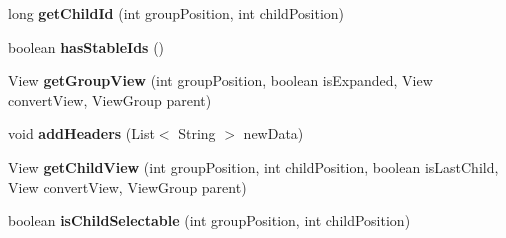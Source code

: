 \begin{DoxyCompactItemize}
\item 
long {\bfseries get\+Child\+Id} (int group\+Position, int child\+Position)\hypertarget{classcom_1_1example_1_1sebastian_1_1tindertp_1_1ExpandableAdpProfile_a355d89c86b95f70f943f68bb691730bb}{}\label{classcom_1_1example_1_1sebastian_1_1tindertp_1_1ExpandableAdpProfile_a355d89c86b95f70f943f68bb691730bb}

\item 
boolean {\bfseries has\+Stable\+Ids} ()\hypertarget{classcom_1_1example_1_1sebastian_1_1tindertp_1_1ExpandableAdpProfile_a005cee212d34b274759437fced99ae5c}{}\label{classcom_1_1example_1_1sebastian_1_1tindertp_1_1ExpandableAdpProfile_a005cee212d34b274759437fced99ae5c}

\item 
View {\bfseries get\+Group\+View} (int group\+Position, boolean is\+Expanded, View convert\+View, View\+Group parent)\hypertarget{classcom_1_1example_1_1sebastian_1_1tindertp_1_1ExpandableAdpProfile_ab4424117d8d85f65b97e80bc33aa8252}{}\label{classcom_1_1example_1_1sebastian_1_1tindertp_1_1ExpandableAdpProfile_ab4424117d8d85f65b97e80bc33aa8252}

\item 
void {\bfseries add\+Headers} (List$<$ String $>$ new\+Data)\hypertarget{classcom_1_1example_1_1sebastian_1_1tindertp_1_1ExpandableAdpProfile_a76a5a65b7956513336b96635a2c15911}{}\label{classcom_1_1example_1_1sebastian_1_1tindertp_1_1ExpandableAdpProfile_a76a5a65b7956513336b96635a2c15911}

\item 
View {\bfseries get\+Child\+View} (int group\+Position, int child\+Position, boolean is\+Last\+Child, View convert\+View, View\+Group parent)\hypertarget{classcom_1_1example_1_1sebastian_1_1tindertp_1_1ExpandableAdpProfile_ab3c328171cd3532f1fb7ff72740dfafc}{}\label{classcom_1_1example_1_1sebastian_1_1tindertp_1_1ExpandableAdpProfile_ab3c328171cd3532f1fb7ff72740dfafc}

\item 
boolean {\bfseries is\+Child\+Selectable} (int group\+Position, int child\+Position)\hypertarget{classcom_1_1example_1_1sebastian_1_1tindertp_1_1ExpandableAdpProfile_a7464476a46d3ee0821fdcbe0a5c9877c}{}\label{classcom_1_1example_1_1sebastian_1_1tindertp_1_1ExpandableAdpProfile_a7464476a46d3ee0821fdcbe0a5c9877c}

\end{DoxyCompactItemize}
